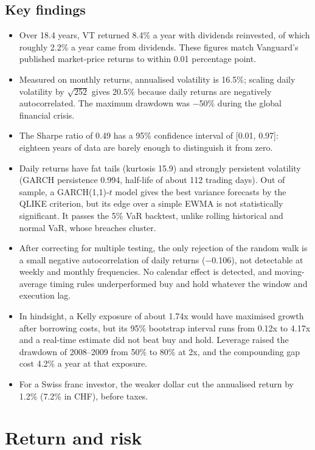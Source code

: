 \documentclass[11pt,a4paper]{article}
\begin{document}
\subsection*{Key findings}
\begin{itemize}[leftmargin=1.2em,itemsep=0.3em,topsep=0.2em]
  \item Over 18.4 years, VT returned 8.4\% a year with dividends reinvested, of which roughly 2.2\% a year came from dividends. These figures match Vanguard's published market-price returns to within 0.01 percentage point.
  \item Measured on monthly returns, annualised volatility is 16.5\%; scaling daily volatility by $\sqrt{252}$ gives 20.5\% because daily returns are negatively autocorrelated. The maximum drawdown was $-$50\% during the global financial crisis.
  \item The Sharpe ratio of 0.49 has a 95\% confidence interval of [0.01, 0.97]: eighteen years of data are barely enough to distinguish it from zero.
  \item Daily returns have fat tails (kurtosis 15.9) and strongly persistent volatility (GARCH persistence 0.994, half-life of about 112 trading days). Out of sample, a GARCH(1,1)-$t$ model gives the best variance forecasts by the QLIKE criterion, but its edge over a simple EWMA is not statistically significant. It passes the 5\% VaR backtest, unlike rolling historical and normal VaR, whose breaches cluster.
  \item After correcting for multiple testing, the only rejection of the random walk is a small negative autocorrelation of daily returns ($-$0.106), not detectable at weekly and monthly frequencies. No calendar effect is detected, and moving-average timing rules underperformed buy and hold whatever the window and execution lag.
  \item In hindsight, a Kelly exposure of about 1.74x would have maximised growth after borrowing costs, but its 95\% bootstrap interval runs from 0.12x to 4.17x and a real-time estimate did not beat buy and hold. Leverage raised the drawdown of 2008--2009 from 50\% to 80\% at 2x, and the compounding gap cost 4.2\% a year at that exposure.
  \item For a Swiss franc investor, the weaker dollar cut the annualised return by 1.2\% (7.2\% in CHF), before taxes.
\end{itemize}

\clearpage
\section{Return and risk}
\end{document}
